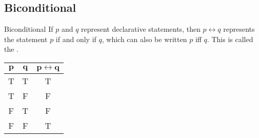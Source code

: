 \documentclass[../notes.tex]{subfiles}
\begin{document}
			\subsection{Biconditional}
				\begin{definition}{Biconditional}
					If $p$ and $q$ represent declarative statements, then $p \leftrightarrow q$ represents the statement $p$ if and only if $q$, which can also be written $p$ iff $q$. This is called the .
				\end{definition}
				\nopagebreak
				\begin{center}
					\begin{tabular}{|c c | c|}
						\hline
						$\mathbf{p}$ & $\mathbf{q}$ & $\mathbf{p \leftrightarrow q}$\\
						\hline
						T & T & T\\
						T & F & F\\
						F & T & F\\
						F & F & T\\
						\hline
					\end{tabular}	
				\end{center}
\end{document}
